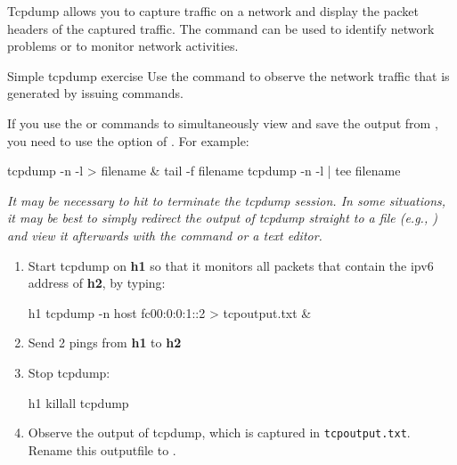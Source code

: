 Tcpdump allows you to capture traffic on a network and display the packet headers of the captured traffic. The  command can be used to identify network problems or to monitor network activities.

\begin{exercise}{Simple tcpdump exercise}\label{ex:tcpdump}
Use the  command to observe the network traffic that is generated by issuing  commands.
\begin{framed}
	If you use the  or  commands to simultaneously view and save the output from , you need to use the  option of . For example:
	\begin{cmdblock}[gobble=1]
		tcpdump -n -l > filename & tail -f filename
		tcpdump -n -l | tee filename
	\end{cmdblock}
	\emph{\remark It may be necessary to hit  to terminate the tcpdump session. In some situations, it may be best to simply redirect the output of tcpdump straight to a file (e.g., ) and view it afterwards with the  command or a text editor.}
\end{framed}

\begin{enumerate}
	\item Start tcpdump on \textbf{h1} so that it monitors all packets that contain the \ac{ipv6} address of \textbf{h2}, by typing:
	\begin{cmdblock}[gobble=1]
	h1 tcpdump -n host fc00:0:0:1::2 > tcpoutput.txt &
	\end{cmdblock}
	\item Send 2 pings from \textbf{h1} to \textbf{h2}
	\item Stop tcpdump:
	\begin{cmdblock}[gobble=1]
	h1 killall tcpdump
	\end{cmdblock}
	\item Observe the output of tcpdump, which is captured in \verb|tcpoutput.txt|. Rename this outputfile to .
\end{enumerate}


\end{exercise}

